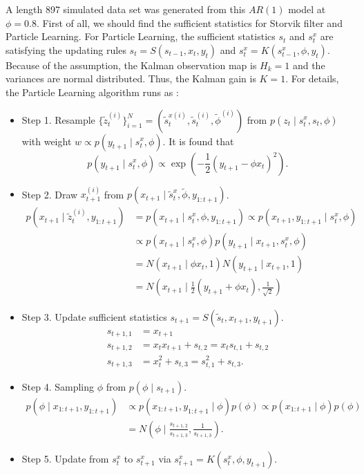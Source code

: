 A length 897 simulated data set was generated from this $\mathit{AR}(1)$ model at $\phi=0.8$. First of all, we should find the sufficient statistics for Storvik filter and Particle Learning. For Particle Learning, the sufficient statistics $s_t$ and $s_t^x$ are satisfying the updating rules $s_t=S(s_{t-1},x_t,y_t)$ and $s_t^x=K(s_{t-1}^x,\phi ,y_t)$. Because of the assumption, the Kalman observation map is $H_k=1$ and the variances are normal distributed. Thus, the Kalman gain is $K=1$. For details, the Particle Learning algorithm runs as : 
\begin{itemize}
\item Step 1. Resample $\{\tilde{z}_t^{(i)}\}_{i=1}^N=(\tilde{s}_t^{x(i)},\tilde{s}_t^{(i)},\tilde{\phi }^{(i)})$ from $p(z_t\mid s_t^x,s_t,\phi )$ with weight $w\propto p(y_{t+1}\mid s_{t}^x,\phi )$. It is found that \begin{equation*}
p(y_{t+1}\mid s_{t}^x,\phi ) \propto \exp \left(-\frac{1}{2}(y_{t+1}-\phi  x_{t})^2 \right).
\end{equation*}
\item Step 2. Draw $x_{t+1}^{(i)}$ from $p(x_{t+1}\mid \tilde{s}_t^x,\tilde{\phi },y_{1:t+1})$. 
\begin{align*}
p(x_{t+1}\mid \tilde{z}_t^{(i)},y_{1:t+1}) &= p(x_{t+1}\mid s_t^x,\phi,y_{1:t+1}) \propto p(x_{t+1},y_{1:t+1}\mid s_t^x,\phi)\\
& \propto p(x_{t+1}\mid s_t^x,\phi)p(y_{t+1}\mid x_{t+1},s_t^x,\phi) \\
&= N(x_{t+1}\mid \phi x_t,1)N(y_{t+1}\mid x_{t+1},1)\\
&= N\left(x_{t+1}\mid \frac{1}{2}(y_{t+1}+\phi x_t),\frac{1}{\sqrt{2}}\right)
\end{align*}
\item Step 3. Update sufficient statistics  $s_{t+1}=S(\tilde{s}_{t}, x_{t+1},y_{t+1})$.
\begin{align*}
s_{t+1,1} &= x_{t+1} \\
s_{t+1,2} &= x_tx_{t+1}+s_{t,2} = x_ts_{t,1}+s_{t,2} \\
s_{t+1,3} &= x_{t}^2 + s_{t,3} = s_{t,1}^2 + s_{t,3} .
\end{align*}
\item Step 4. Sampling $\phi $ from $p(\phi  \mid  s_{t+1})$.
\begin{align*}
p(\phi  \mid  x_{1:t+1},y_{1:t+1}) & \propto p(x_{1:t+1},y_{1:t+1}\mid \phi )p(\phi )\propto p(x_{1:t+1}\mid \phi )p(\phi )\\
&= N\left( \phi \mid  \frac{s_{t+1,2}}{s_{t+1,3}},\frac{1}{s_{t+1,3}} \right).
\end{align*}
\item Step 5. Update from $s_{t}^x$ to $s_{t+1}^x$ via $s_{t+1}^x = K(s_{t}^x,\phi ,y_{t+1})$.
\end{itemize}


